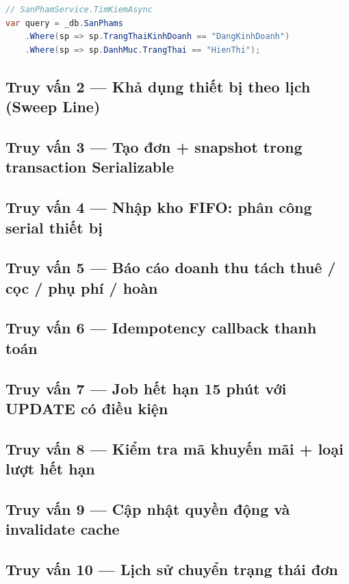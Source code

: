 \begin{lstlisting}[language=csharp, caption={LINQ --- TimKiemAsync}]
// SanPhamService.TimKiemAsync
var query = _db.SanPhams
    .Where(sp => sp.TrangThaiKinhDoanh == "DangKinhDoanh")
    .Where(sp => sp.DanhMuc.TrangThai == "HienThi");
\end{lstlisting}

\subsection{Truy vấn 2 --- Khả dụng thiết bị theo lịch (Sweep Line)}

\subsection{Truy vấn 3 --- Tạo đơn + snapshot trong transaction Serializable}

\subsection{Truy vấn 4 --- Nhập kho FIFO: phân công serial thiết bị}

\subsection{Truy vấn 5 --- Báo cáo doanh thu tách thuê / cọc / phụ phí / hoàn}

\subsection{Truy vấn 6 --- Idempotency callback thanh toán}

\subsection{Truy vấn 7 --- Job hết hạn 15 phút với UPDATE có điều kiện}

\subsection{Truy vấn 8 --- Kiểm tra mã khuyến mãi + loại lượt hết hạn}

\subsection{Truy vấn 9 --- Cập nhật quyền động và invalidate cache}

\subsection{Truy vấn 10 --- Lịch sử chuyển trạng thái đơn}


